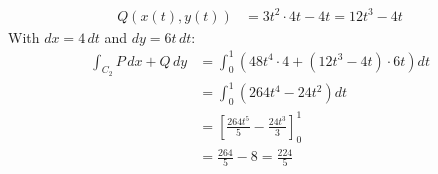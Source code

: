 \begin{solution}
\begin{enumerate}
$$\begin{aligned}
				      Q(x(t), y(t)) & = 3t^2 \cdot 4t - 4t = 12t^3 - 4t
			      \end{aligned}
		      $$
		      With $dx = 4 \, dt$ and $dy = 6t \, dt$:
		      $$
			      \begin{aligned}
				      \int_{C_2} P\,dx + Q\,dy & = \int_0^1 \left( 48t^4 \cdot 4 + (12t^3 - 4t) \cdot 6t \right) dt \\
				                               & = \int_0^1 \left(264t^4 - 24t^2\right)dt                           \\
				                               & = \left[\frac{264t^5}{5} - \frac{24t^3}{3}\right]_0^1              \\
				                               & = \frac{264}{5} - 8 = \boxed{\frac{224}{5}}
			      \end{aligned}
		      $$
	\end{enumerate}
\end{solution}
